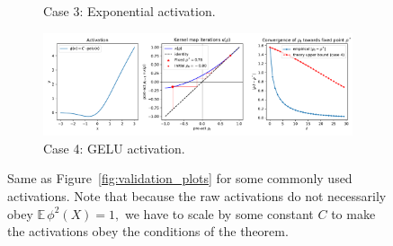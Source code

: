 \documentclass[twoside]{article}
\newcommand{\E}{\mathbb{E}\,}
\theoremstyle{definition}
\begin{document}
\begin{figure}[ht!]
\begin{subfigure}[b]{0.7\textwidth}
        \caption{\small Case 3: Exponential activation.} 
    \end{subfigure}
    \hfill
    \begin{subfigure}[b]{0.7\textwidth}
        \centering
        \includegraphics[width=\textwidth]{./kernel_map_convergence_case_3_gelu.pdf}
        \caption{\small Case 4: GELU activation.}
    \end{subfigure}
    \caption{\small Same as Figure~\ref{fig:validation_plots} for some commonly used activations. Note that because the raw activations do not necessarily obey $\E \phi^2(X)=1,$ we have to scale by some constant $C$ to make the activations obey the conditions of the theorem.}
    \label{fig:validation_plots_real_activations}
\end{figure}
\end{document}
